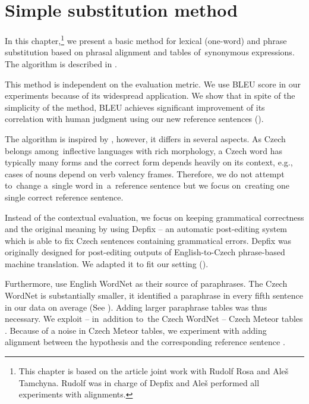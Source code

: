 \chapter{Simple substitution method}

In this chapter,\footnote{This chapter is based on the article 
\citep{barancikova:2014} joint work with Rudolf Rosa and Ale\v{s} Tamchyna.
Rudolf was in charge of Depfix and Ale\v{s} performed all experiments with 
alignments.} we present a basic method for lexical (one-word) and phrase 
substitution based on phrasal alignment and tables of~synonymous 
expressions. The algorithm is described in .


This method is independent on the evaluation metric. We use BLEU score in our 
experiments because of its widespread application.  We show that in spite of the 
simplicity of the method, BLEU achieves significant improvement of its 
correlation with human judgment using our new reference sentences ().

The algorithm is inspired by \cite{kauchak}, however, it differs in several 
aspects. As Czech belongs among~inflective languages with rich morphology, a 
Czech word has typically many forms and the correct form depends heavily on its 
context, e.g., cases of nouns depend on verb valency frames. Therefore, we do 
not attempt to~change a~single word in~a~reference sentence but we focus 
on~creating one single correct reference sentence.

Instead of the contextual evaluation, we focus on keeping grammatical 
correctness and the original meaning by using Depfix \citep{depfix} -- an 
automatic post-editing system which is able to fix Czech sentences containing 
grammatical errors. Depfix was originally designed for post-editing outputs of 
English-to-Czech phrase-based machine translation. We adapted it to fit our 
setting ().

Furthermore, \citet{kauchak} use English WordNet as their source of paraphrases.
The Czech WordNet \citep{czech-wordnet} is substantially smaller, it identified a
paraphrase in every fifth sentence in our data on average (See 
). Adding larger paraphrase tables was thus necessary.
We exploit --  in~addition to~the Czech WordNet --  Czech Meteor tables 
\citep{meteor-tables}.  Because of a noise in Czech Meteor tables, we 
experiment with adding alignment between the hypothesis and the corresponding 
reference sentence .


